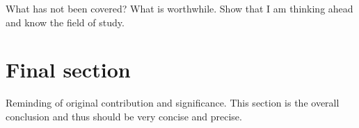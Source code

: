 

What has not been covered? What is worthwhile.
Show that I am thinking ahead and know the field of study.



\section{Final section}
Reminding of original contribution and significance.
This section is the overall conclusion and thus should be very concise and precise.

